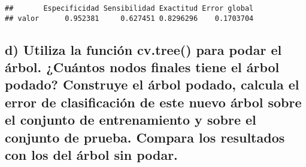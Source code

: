 \documentclass[
]{article}
\newenvironment{Shaded}{\begin{snugshade}}{\end{snugshade}}
\newcommand{\AttributeTok}[1]{\textcolor[rgb]{0.77,0.63,0.00}{#1}}
\newcommand{\CommentTok}[1]{\textcolor[rgb]{0.56,0.35,0.01}{\textit{#1}}}
\newcommand{\ControlFlowTok}[1]{\textcolor[rgb]{0.13,0.29,0.53}{\textbf{#1}}}
\newcommand{\DecValTok}[1]{\textcolor[rgb]{0.00,0.00,0.81}{#1}}
\newcommand{\FunctionTok}[1]{\textcolor[rgb]{0.00,0.00,0.00}{#1}}
\newcommand{\NormalTok}[1]{#1}
\newcommand{\OtherTok}[1]{\textcolor[rgb]{0.56,0.35,0.01}{#1}}
\newcommand{\SpecialCharTok}[1]{\textcolor[rgb]{0.00,0.00,0.00}{#1}}
\newcommand{\StringTok}[1]{\textcolor[rgb]{0.31,0.60,0.02}{#1}}
\begin{document}
\begin{Shaded}
\end{Shaded}

\begin{verbatim}
##       Especificidad Sensibilidad Exactitud Error global
## valor      0.952381     0.627451 0.8296296    0.1703704
\end{verbatim}

\hypertarget{d-utiliza-la-funciuxf3n-cv.tree-para-podar-el-uxe1rbol.-cuuxe1ntos-nodos-finales-tiene-el-uxe1rbol-podado-construye-el-uxe1rbol-podado-calcula-el-error-de-clasificaciuxf3n-de-este-nuevo-uxe1rbol-sobre-el-conjunto-de-entrenamiento-y-sobre-el-conjunto-de-prueba.-compara-los-resultados-con-los-del-uxe1rbol-sin-podar.}{%
\subsection{d) Utiliza la función cv.tree() para podar el árbol.
¿Cuántos nodos finales tiene el árbol podado? Construye el árbol podado,
calcula el error de clasificación de este nuevo árbol sobre el conjunto
de entrenamiento y sobre el conjunto de prueba. Compara los resultados
con los del árbol sin
podar.}\label{d-utiliza-la-funciuxf3n-cv.tree-para-podar-el-uxe1rbol.-cuuxe1ntos-nodos-finales-tiene-el-uxe1rbol-podado-construye-el-uxe1rbol-podado-calcula-el-error-de-clasificaciuxf3n-de-este-nuevo-uxe1rbol-sobre-el-conjunto-de-entrenamiento-y-sobre-el-conjunto-de-prueba.-compara-los-resultados-con-los-del-uxe1rbol-sin-podar.}}
\end{document}
